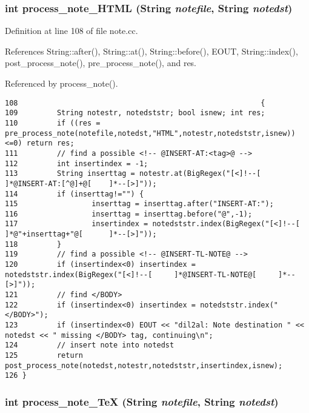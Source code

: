 \subsubsection{\setlength{\rightskip}{0pt plus 5cm}int process\_\-note\_\-HTML ({\bf String} {\em notefile}, {\bf String} {\em notedst})}\label{dil2al_8hh_a333}




Definition at line 108 of file note.cc.

References String::after(), String::at(), String::before(), EOUT, String::index(), post\_\-process\_\-note(), pre\_\-process\_\-note(), and res.

Referenced by process\_\-note().



\footnotesize\begin{verbatim}108                                                        {
109         String notestr, notedststr; bool isnew; int res;
110         if ((res = pre_process_note(notefile,notedst,"HTML",notestr,notedststr,isnew))<=0) return res;
111         // find a possible <!-- @INSERT-AT:<tag>@ -->
112         int insertindex = -1;
113         String inserttag = notestr.at(BigRegex("[<]!--[         ]*@INSERT-AT:[^@]+@[    ]*--[>]"));
114         if (inserttag!="") {
115                 inserttag = inserttag.after("INSERT-AT:");
116                 inserttag = inserttag.before("@",-1);
117                 insertindex = notedststr.index(BigRegex("[<]!--[        ]*@"+inserttag+"@[      ]*--[>]"));
118         }
119         // find a possible <!-- @INSERT-TL-NOTE@ -->
120         if (insertindex<0) insertindex = notedststr.index(BigRegex("[<]!--[     ]*@INSERT-TL-NOTE@[     ]*--[>]"));
121         // find </BODY>
122         if (insertindex<0) insertindex = notedststr.index("</BODY>");
123         if (insertindex<0) EOUT << "dil2al: Note destination " << notedst << " missing </BODY> tag, continuing\n";
124         // insert note into notedst
125         return post_process_note(notedst,notestr,notedststr,insertindex,isnew);
126 }
\end{verbatim}\normalsize 
{}
\subsubsection{\setlength{\rightskip}{0pt plus 5cm}int process\_\-note\_\-Te\-X ({\bf String} {\em notefile}, {\bf String} {\em notedst})}\label{dil2al_8hh_a334}




